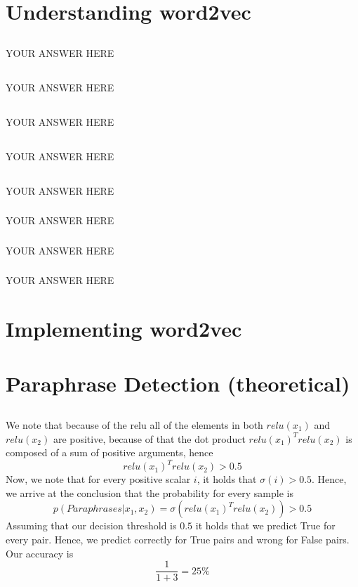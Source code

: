 \documentclass{article}
\begin{document}
\section{Understanding word2vec}
\subsection{}
YOUR ANSWER HERE
\subsection{}
YOUR ANSWER HERE
\subsection{}
YOUR ANSWER HERE
\subsection{}
YOUR ANSWER HERE
\subsection{}
YOUR ANSWER HERE
\subsubsection{}
YOUR ANSWER HERE
\subsubsection{}
YOUR ANSWER HERE
\subsubsection{}
YOUR ANSWER HERE
\section{Implementing word2vec}
\setcounter{subsection}{4}
\section{Paraphrase Detection (theoretical)}
\subsection{}
We note that because of the relu all of the elements in both $relu(x_1)$ and $relu(x_2)$ are positive, 
because of that the dot product $relu(x_1)^T relu(x_2)$ is composed of a sum of positive arguments, hence 
$$relu(x_1)^T relu(x_2) > 0.5$$
Now, we note that for every positive scalar $i$, it holds that $\sigma (i) > 0.5$. Hence, we arrive at the conclusion that the probability for every sample is
$$p(Paraphrases|x_1, x_2) = \sigma (relu(x_1)^T relu(x_2)) > 0.5$$
Assuming that our decision threshold is $0.5$ it holds that we predict True for every pair.
Hence, we predict correctly for True pairs and wrong for False pairs. Our accuracy is 
$$\frac{1}{1+3}=25 \% $$
\end{document}
